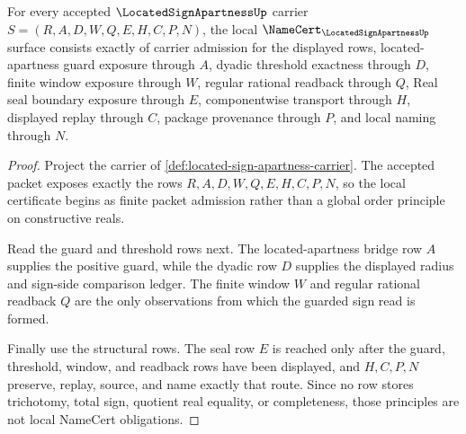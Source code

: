 \begin{theorem}
\label{thm:located-sign-apartness-namecert-obligations}
For every accepted $\LocatedSignApartnessUp$ carrier $S=(R,A,D,W,Q,E,H,C,P,N)$, the local $\NameCert_{\LocatedSignApartnessUp}$ surface consists exactly of carrier admission for the displayed rows, located-apartness guard exposure through $A$, dyadic threshold exactness through $D$, finite window exposure through $W$, regular rational readback through $Q$, Real seal boundary exposure through $E$, componentwise transport through $H$, displayed replay through $C$, package provenance through $P$, and local naming through $N$.
\end{theorem}
\begin{proof}
Project the carrier of \autoref{def:located-sign-apartness-carrier}. The accepted packet exposes exactly the rows $R,A,D,W,Q,E,H,C,P,N$, so the local certificate begins as finite packet admission rather than a global order principle on constructive reals.

Read the guard and threshold rows next. The located-apartness bridge row $A$ supplies the positive guard, while the dyadic row $D$ supplies the displayed radius and sign-side comparison ledger. The finite window $W$ and regular rational readback $Q$ are the only observations from which the guarded sign read is formed.

Finally use the structural rows. The seal row $E$ is reached only after the guard, threshold, window, and readback rows have been displayed, and $H,C,P,N$ preserve, replay, source, and name exactly that route. Since no row stores trichotomy, total sign, quotient real equality, or completeness, those principles are not local NameCert obligations.
\end{proof}

